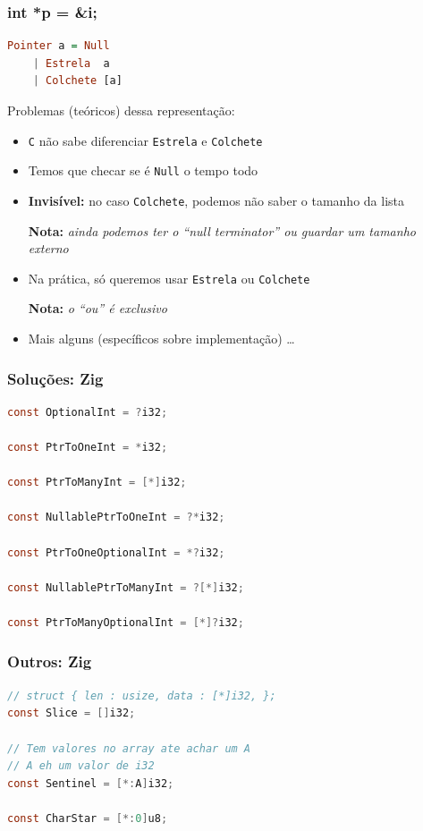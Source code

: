 \documentclass{beamer}
\newcommand{\nota}[1]{\textbf{Nota:}\textit{ #1}}
\begin{document}
\begin{frame}[fragile]
    \frametitle{int *p = \&i;}
    \begin{lstlisting}[language=Haskell]
Pointer a = Null
    | Estrela  a
    | Colchete [a]
    \end{lstlisting}
    \vfill
    Problemas (teóricos) dessa representação:
    \begin{itemize}
        \item
            \texttt{C} não sabe diferenciar
            \texttt{Estrela} e \texttt{Colchete}
        \item
            Temos que checar se é \texttt{Null} o tempo todo
        \item
            \textbf{Invisível:} no caso \texttt{Colchete},
            podemos não saber o tamanho da lista
            \par
            \nota{ainda podemos ter o ``null terminator''
            ou guardar um tamanho externo}
        \item
            Na prática, só queremos usar
            \texttt{Estrela} ou \texttt{Colchete}
            \par
            \nota{o ``ou'' é exclusivo}
        \item
            Mais alguns (específicos sobre implementação) \dots
    \end{itemize}
\end{frame}

\begin{frame}[fragile]
    \frametitle{Soluções: Zig}
    \begin{lstlisting}[language=C]
const OptionalInt = ?i32;

const PtrToOneInt = *i32;

const PtrToManyInt = [*]i32;

const NullablePtrToOneInt = ?*i32;

const PtrToOneOptionalInt = *?i32;

const NullablePtrToManyInt = ?[*]i32;

const PtrToManyOptionalInt = [*]?i32;
    \end{lstlisting}
\end{frame}

\begin{frame}[fragile]
    \frametitle{Outros: Zig}
    \begin{lstlisting}[language=C]
// struct { len : usize, data : [*]i32, };
const Slice = []i32;

// Tem valores no array ate achar um A
// A eh um valor de i32
const Sentinel = [*:A]i32;

const CharStar = [*:0]u8;
    \end{lstlisting}
\end{frame}
\end{document}

